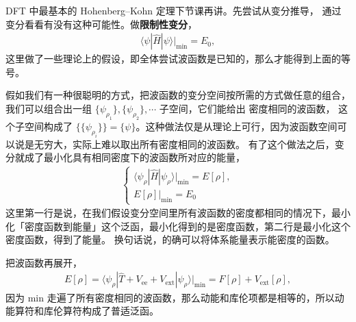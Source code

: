 DFT 中最基本的 Hohenberg--Kohn 定理下节课再讲。先尝试从变分推导，
通过变分看看有没有这种可能性。做\textbf{限制性变分}，
\begin{align}
    \langle \psi | \hat H | \psi \rangle |_{\text{min}} = E_0,
\end{align}
这里做了一些理论上的假设，即全体尝试波函数是已知的，那么才能得到上面的等号。

假如我们有一种很聪明的方式，把波函数的变分空间按所需的方式做任意的组合，我们可以组合出一组 $\{\psi_{\rho_1}\}, \{\psi_{\rho_2}\}, \cdots$ 子空间，它们能给出
密度相同的波函数，
这个子空间构成了 $\big\{\{\psi_{\rho_i}\}\big\} = \{\psi\}$。这种做法仅是从理论上可行，因为波函数空间可以说是无穷大，实际上难以取出所有密度相同的波函数。
有了这个做法之后，变分就成了最小化具有相同密度下的波函数所对应的能量，
\begin{align}
\left\{
\begin{array}{l}
\langle \psi_\rho | \hat H |\psi_\rho \rangle|_\text{min} = E[\rho], \\
E[\rho] | _{\text{min}} = E_0
\end{array}
\right.
\end{align}
这里第一行是说，在我们假设变分空间里所有波函数的密度都相同的情况下，最小化「密度函数到能量」这个泛函，最小化得到的是密度函数，第二行是最小化这个密度函数，得到了能量。
换句话说，的确可以将体系能量表示能密度的函数。


把波函数再展开，
\begin{align}
    E[\rho] = 
\langle    \psi_\rho | \hat T + V_{\mathrm{ee}} + V_{\mathrm{ext}} | \psi_\rho \rangle | _{\text{min}}  
= F[\rho] + V_{\mathrm{ext}}[\rho], 
\end{align}
因为 min 走遍了所有密度相同的波函数，那么动能和库伦项都是相等的，所以动能算符和库伦算符构成了普适泛函。
